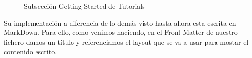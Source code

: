 \begin{figure}[h!]
    \centering
    \par
    \par
    \caption{Subsección Getting Started de Tutorials }
    \label{fig:gettinWeb}
\end{figure}

Su implementación a diferencia de lo demás visto hasta ahora esta escrita en MarkDown. Para ello, como venimos haciendo, en el Front Matter de nuestro fichero damos un título y referenciamos el layout que se va a usar para mostar el contenido escrito. 

